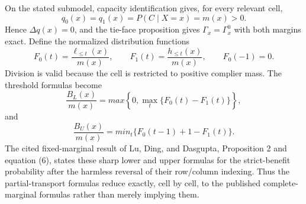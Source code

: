 On the stated submodel, capacity identification gives, for every relevant cell,
\[
q_0(x)=q_1(x)=P(C\mid X=x)=m(x)>0.
\]
Hence \(\Delta q(x)=0\), and the tie-face proposition gives \(\Gamma_x=\Gamma_x^0\) with both margins exact.  Define the normalized distribution functions
\[
F_0(t)=\frac{\ell_{\le t}(x)}{m(x)},\qquad
F_1(t)=\frac{h_{\le t}(x)}{m(x)},\qquad F_0(-1)=0.
\]
Division is valid because the cell is restricted to positive complier mass.  The threshold formulas become
\[
\frac{B_L(x)}{m(x)}=max\left\{0,\max_t\{F_0(t)-F_1(t)\}\right\},
\]
and
\[
\frac{B_U(x)}{m(x)}=min_t\{F_0(t-1)+1-F_1(t)\}.
\]
The cited fixed-marginal result of Lu, Ding, and Dasgupta, Proposition 2 and equation (6), states these sharp lower and upper formulas for the strict-benefit probability after the harmless reversal of their row/column indexing.  Thus the partial-transport formulas reduce exactly, cell by cell, to the published complete-marginal formulas rather than merely implying them.